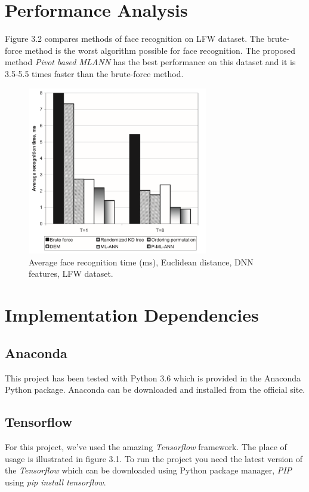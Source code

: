 \section{Performance Analysis}
Figure 3.2 compares methods of face recognition on LFW dataset. The brute-force method is the worst algorithm possible for face recognition. The proposed method \textit{Pivot based MLANN} has the best performance on this dataset and it is 3.5-5.5 times faster than the brute-force method.
\begin{figure}[!h]\centering
	\includegraphics[width=0.7\textwidth]{timings.PNG}
	\caption{Average face recognition time (ms), Euclidean distance, DNN features, LFW dataset.}
	\label{pl1}
\end{figure}

\section{Implementation Dependencies}
\subsection{Anaconda}
This project has been tested with Python 3.6 which is provided in the Anaconda Python package. Anaconda can be downloaded and installed from the official site.

\subsection{Tensorflow}
For this project, we've used the amazing \textit{Tensorflow} framework. The place of usage is illustrated in figure 3.1. To run the project you need the latest version of the \textit{Tensorflow} which can be downloaded using Python package manager, \textit{PIP} using \textit{pip install tensorflow}.

